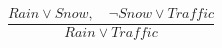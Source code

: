 \documentclass[preview,border=4pt]{standalone}
\begin{document}
\[
\frac{Rain \lor Snow,\quad \neg Snow \lor Traffic}{Rain \lor Traffic}
\]
\end{document}

